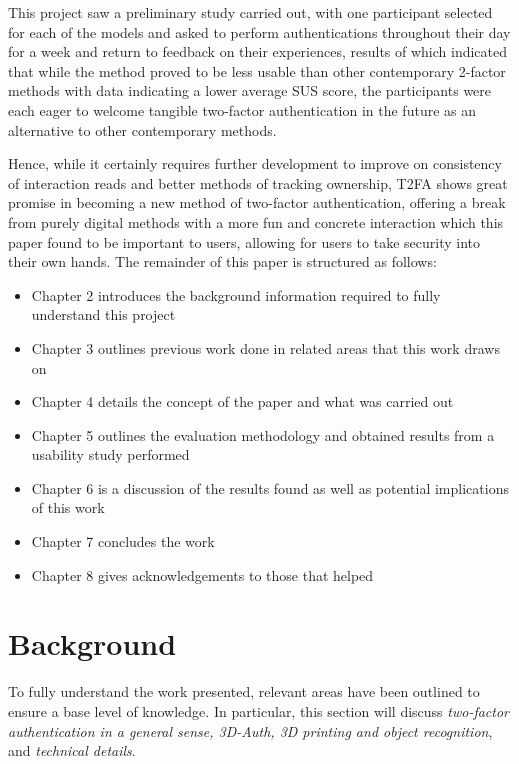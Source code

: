 \documentclass{l4proj}
\begin{document}
This project saw a preliminary study carried out, with one participant selected for each of the models and asked to perform authentications throughout their day for a week and return to feedback on their experiences, results of which indicated that while the method proved to be less usable than other contemporary 2-factor methods with data indicating a lower average SUS score, the participants were each eager to welcome tangible two-factor authentication in the future as an alternative to other contemporary methods.

Hence, while it certainly requires further development to improve on consistency of interaction reads and better methods of tracking ownership, T2FA shows great promise in becoming a new method of two-factor authentication, offering a break from purely digital methods with a more fun and concrete interaction which this paper found to be important to users, allowing for users to take security into their own hands.
 \newpage
The remainder of this paper is structured as follows: 
\begin{itemize}
    \item Chapter 2 introduces the background information required to fully understand this project
    \item Chapter 3 outlines previous work done in related areas that this work draws on
    \item Chapter 4 details the concept of the paper and what was carried out
    \item Chapter 5 outlines the evaluation methodology and obtained results from a usability study performed
    \item Chapter 6 is a discussion of the results found as well as potential implications of this work
    \item Chapter 7 concludes the work
    \item Chapter 8 gives acknowledgements to those that helped
\end{itemize}


\chapter{Background}

To fully understand the work presented, relevant areas have been outlined to ensure a base level of knowledge. In particular, this section will discuss \textit{two-factor authentication in a general sense, 3D-Auth, 3D printing and object recognition}, and \textit{technical details}.
\end{document}
